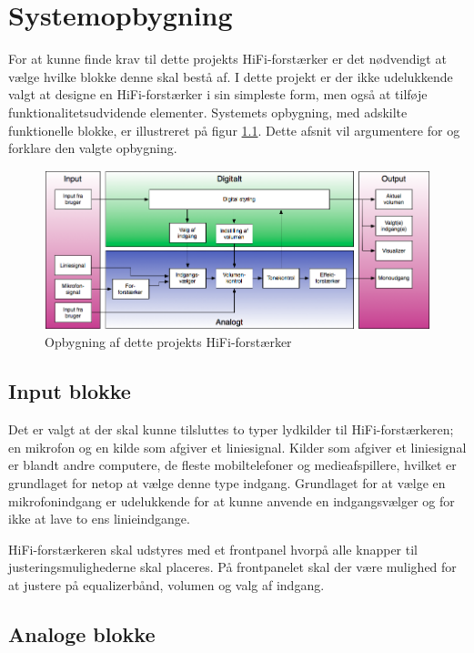 \chapter{Systemopbygning}
For at kunne finde krav til dette projekts HiFi-forstærker er det nødvendigt at vælge hvilke blokke denne skal bestå af. I dette projekt er der ikke udelukkende valgt at designe en HiFi-forstærker i sin simpleste form, men også at tilføje funktionalitetsudvidende elementer. Systemets opbygning, med adskilte funktionelle blokke, er illustreret på figur \ref{fig:hififorstaerker_opbygning}. Dette afsnit vil argumentere for og forklare den valgte opbygning. 


\begin{figure}[h]
\centering
\includegraphics[scale=0.5]{systemopbygning/forstaerker_opbygning.png}
\caption{Opbygning af dette projekts HiFi-forstærker}
\label{fig:hififorstaerker_opbygning}
\end{figure}


\section*{Input blokke}
Det er valgt at der skal kunne tilsluttes to typer lydkilder til HiFi-forstærkeren; en mikrofon og en kilde som afgiver et liniesignal. Kilder som afgiver et liniesignal er blandt andre computere, de fleste mobiltelefoner og medieafspillere, hvilket er grundlaget for netop at vælge denne type indgang. 
Grundlaget for at vælge en mikrofonindgang er udelukkende for at kunne anvende en indgangsvælger og for ikke at lave to ens linieindgange. 

HiFi-forstærkeren skal udstyres med et frontpanel hvorpå alle knapper til justeringsmulighederne skal placeres. På frontpanelet skal der være mulighed for at justere på equalizerbånd, volumen og valg af indgang.

\section*{Analoge blokke}


